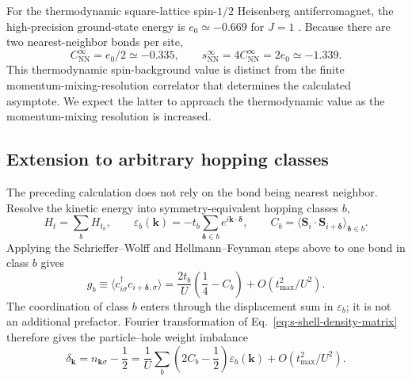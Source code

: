 \documentclass[10pt]{article}
\newcommand{\Cnn}{C_{\mathrm{NN}}}
\newcommand{\dk}{\delta_{\mathbf{k}}}
\begin{document}
For the thermodynamic square-lattice spin-$1/2$ Heisenberg antiferromagnet, the high-precision ground-state energy is $e_0\simeq-0.669$ for $J=1$ \cite{sandvik2026highprecision}. Because there are two nearest-neighbor bonds per site,
\begin{equation}
\Cnn^{\infty}=e_0/2\simeq-0.335,\qquad
s_{\mathrm{NN}}^{\infty}=4\Cnn^{\infty}=2e_0\simeq-1.339.
\label{eq:s-cnn-infty}
\end{equation}
This thermodynamic spin-background value is distinct from the finite
momentum-mixing-resolution correlator that determines the calculated
asymptote.  We expect the latter to approach the thermodynamic value as the
momentum-mixing resolution is increased.

\subsection{Extension to arbitrary hopping classes}
The preceding calculation does not rely on the bond being nearest neighbor.
Resolve the kinetic energy into symmetry-equivalent hopping classes $b$,
\begin{equation}
 H_t=\sum_b H_{t_b},\qquad
 \varepsilon_b(\mathbf k)=-t_b\sum_{\boldsymbol\delta\in b}
 e^{i\mathbf k\cdot\boldsymbol\delta},\qquad
 C_b=\langle\mathbf S_i\cdot\mathbf S_{i+\boldsymbol\delta}\rangle_{\boldsymbol\delta\in b}.
\label{eq:s-shell-definitions}
\end{equation}
Applying the Schrieffer--Wolff and Hellmann--Feynman steps above to one bond
in class $b$ gives
\begin{equation}
 g_b\equiv\langle c^\dagger_{i\sigma}
 c_{i+\boldsymbol\delta,\sigma}\rangle
 =\frac{2t_b}{U}\left(\frac14-C_b\right)
 +O(t_{\max}^2/U^2).
\label{eq:s-shell-density-matrix}
\end{equation}
The coordination of class $b$ enters through the displacement sum in
$\varepsilon_b$; it is not an additional prefactor. Fourier transformation
of Eq.~\ref{eq:s-shell-density-matrix} therefore gives the particle--hole
weight imbalance
\begin{equation}
 \dk=n_{\mathbf k\sigma}-\frac12
 =\frac1U\sum_b\left(2C_b-\frac12\right)
 \varepsilon_b(\mathbf k)+O(t_{\max}^2/U^2).
\label{eq:s-shell-weight-imbalance}
\end{equation}
\end{document}
